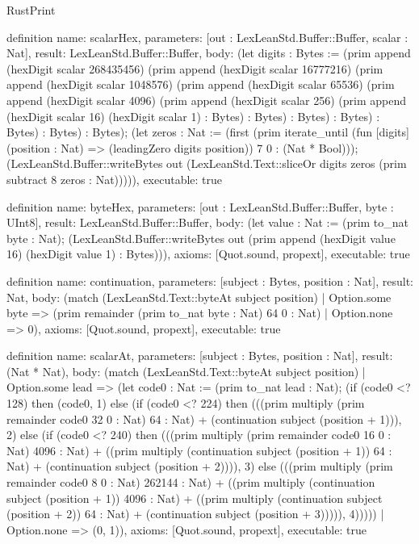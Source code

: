 \begin{lexlean}{RustPrint}
\begin{semanticmodule}
definition{
  name: scalarHex,
  parameters: [out : LexLeanStd.Buffer::Buffer, scalar : Nat],
  result: LexLeanStd.Buffer::Buffer,
  body: (let digits : Bytes := (prim append (hexDigit scalar 268435456) (prim append (hexDigit scalar 16777216) (prim append (hexDigit scalar 1048576) (prim append (hexDigit scalar 65536) (prim append (hexDigit scalar 4096) (prim append (hexDigit scalar 256) (prim append (hexDigit scalar 16) (hexDigit scalar 1) : Bytes) : Bytes) : Bytes) : Bytes) : Bytes) : Bytes) : Bytes); (let zeros : Nat := (first (prim iterate_until (fun [digits] (position : Nat) => (leadingZero digits position)) 7 0 : (Nat * Bool))); (LexLeanStd.Buffer::writeBytes out (LexLeanStd.Text::sliceOr digits zeros (prim subtract 8 zeros : Nat))))),
  executable: true
}

definition{
  name: byteHex,
  parameters: [out : LexLeanStd.Buffer::Buffer, byte : UInt8],
  result: LexLeanStd.Buffer::Buffer,
  body: (let value : Nat := (prim to_nat byte : Nat); (LexLeanStd.Buffer::writeBytes out (prim append (hexDigit value 16) (hexDigit value 1) : Bytes))),
  axioms: [Quot.sound, propext],
  executable: true
}

definition{
  name: continuation,
  parameters: [subject : Bytes, position : Nat],
  result: Nat,
  body: (match (LexLeanStd.Text::byteAt subject position)
    | Option.some byte => (prim remainder (prim to_nat byte : Nat) 64 0 : Nat)
    | Option.none => 0),
  axioms: [Quot.sound, propext],
  executable: true
}

definition{
  name: scalarAt,
  parameters: [subject : Bytes, position : Nat],
  result: (Nat * Nat),
  body: (match (LexLeanStd.Text::byteAt subject position)
    | Option.some lead => (let code0 : Nat := (prim to_nat lead : Nat); (if (code0 <? 128) then (code0, 1) else (if (code0 <? 224) then (((prim multiply (prim remainder code0 32 0 : Nat) 64 : Nat) + (continuation subject (position + 1))), 2) else (if (code0 <? 240) then (((prim multiply (prim remainder code0 16 0 : Nat) 4096 : Nat) + ((prim multiply (continuation subject (position + 1)) 64 : Nat) + (continuation subject (position + 2)))), 3) else (((prim multiply (prim remainder code0 8 0 : Nat) 262144 : Nat) + ((prim multiply (continuation subject (position + 1)) 4096 : Nat) + ((prim multiply (continuation subject (position + 2)) 64 : Nat) + (continuation subject (position + 3))))), 4)))))
    | Option.none => (0, 1)),
  axioms: [Quot.sound, propext],
  executable: true
}


\end{semanticmodule}
\end{lexlean}
